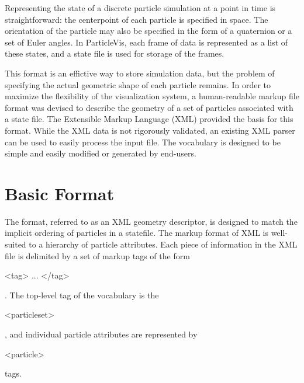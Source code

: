 %
%
%

\newcommand{\xml}[1]{\begin{tt}#1\end{tt}}
\renewcommand{\labelitemi}{$\bullet$}
\renewcommand{\labelitemii}{$\bullet$}
\renewcommand{\labelitemiii}{$\bullet$}

%
\label{XML-Section}

Representing the state of a discrete particle simulation at a point in time is straightforward:
the centerpoint of each particle is specified in space.  The orientation of the particle may
also be specified in the form of a quaternion or a set of Euler angles.
In ParticleVis, each frame of data is represented as a list of these states, and a state file is used for storage of the frames.

This format is an effictive way to store simulation data, but the problem of
specifying the actual geometric shape of each particle remains.  In order to maximize the
flexibility of the visualization system, a human-readable markup file format was devised
to describe the geometry of a set of particles associated with a state file.
The Extensible Markup Language (XML) provided the basis for this format.  While the XML
data is not rigorously validated, an existing XML parser can be used to easily process
the input file.  The vocabulary is designed to be simple and easily modified or generated
by end-users.

\section{Basic Format}

The format, referred to as an XML geometry descriptor, is designed to match
the implicit ordering of particles in a statefile.
The markup format of XML is well-suited to a hierarchy of particle attributes.
Each piece of information in the XML file is delimited by a set of markup tags of the form
\xml{<tag> ... </tag>}.
The top-level tag of the vocabulary is the \xml{<particleset>}, and individual particle attributes are 
represented by \xml{<particle>} tags. 

